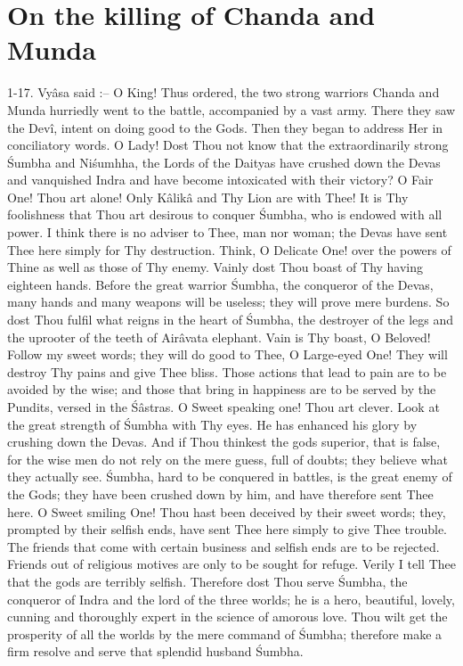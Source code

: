 ﻿\chapter{On the killing of Chanda and Munda}

1-17. Vy\^asa said :-- O King! Thus ordered, the two strong warriors Chanda and Munda hurriedly went to the battle, accompanied by a vast army. There they saw the Dev\^i, intent on doing good to the Gods. Then they began to address Her in conciliatory words. O Lady! Dost Thou not know that the extraordinarily strong \'Sumbha and Ni\'sumhha, the Lords of the Daityas have crushed down the Devas and vanquished Indra and have become intoxicated with their victory? O Fair One! Thou art alone! Only K\^alik\^a and Thy Lion are with Thee! It is Thy foolishness that Thou art desirous to conquer \'Sumbha, who is endowed with all power. I think there is no adviser to Thee, man nor woman; the Devas have sent Thee here simply for Thy destruction. Think, O Delicate One! over the powers of Thine as well as those of Thy enemy. Vainly dost Thou boast of Thy having eighteen hands. Before the great warrior \'Sumbha, the conqueror of the Devas, many hands and many weapons will be useless; they will prove mere burdens. So dost Thou fulfil what reigns in the heart of \'Sumbha, the destroyer of the legs and the uprooter of the teeth of Air\^avata elephant. Vain is Thy boast, O Beloved! Follow my sweet words; they will do good to Thee, O Large-eyed One! They will destroy Thy pains and give Thee bliss. Those actions that lead to pain are to be avoided by the wise; and those that bring in happiness are to be served by the Pundits, versed in the \'S\^astras. O Sweet speaking one! Thou art clever. Look at the great strength of \'Sumbha with Thy eyes. He has enhanced his glory by crushing down the Devas. And if Thou thinkest the gods superior, that is false, for the wise men do not rely on the mere guess, full of doubts; they believe what they actually see. \'Sumbha, hard to be conquered in battles, is the great enemy of the Gods; they have been crushed down by him, and have therefore sent Thee here. O Sweet smiling One! Thou hast been deceived by their sweet words; they, prompted by their selfish ends, have sent Thee here simply to give Thee trouble. The friends that come with certain business and selfish ends are to be rejected. Friends out of religious motives are only to be sought for refuge. Verily I tell Thee that the gods are terribly selfish. Therefore dost Thou serve \'Sumbha, the conqueror of Indra and the lord of the three worlds; he is a hero, beautiful, lovely, cunning and thoroughly expert in the science of amorous love. Thou wilt get the prosperity of all the worlds by the mere command of \'Sumbha; therefore make a firm resolve and serve that splendid husband \'Sumbha.

